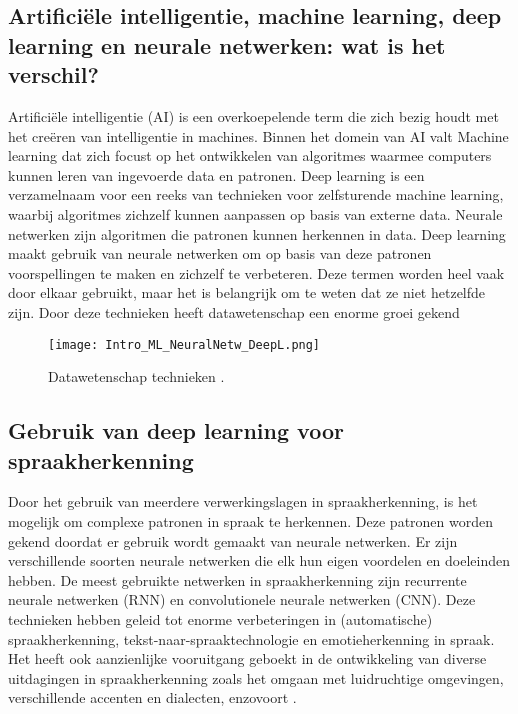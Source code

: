 \subsection{Artificiële intelligentie, machine learning, deep learning en neurale netwerken: wat is het verschil?}
Artificiële intelligentie (AI) is een overkoepelende term die zich bezig houdt met het creëren van intelligentie in machines. Binnen het domein van AI valt Machine learning dat zich focust op het ontwikkelen van algoritmes waarmee computers kunnen leren van ingevoerde data en patronen. Deep learning is een verzamelnaam voor een reeks van technieken voor zelfsturende machine learning, waarbij algoritmes zichzelf kunnen aanpassen op basis van externe data. Neurale netwerken zijn algoritmen die patronen kunnen herkennen in data. Deep learning maakt gebruik van neurale netwerken om op basis van deze patronen voorspellingen te maken en zichzelf te verbeteren. Deze termen worden heel vaak door elkaar gebruikt, maar het is belangrijk om te weten dat ze niet hetzelfde zijn. Door deze technieken heeft datawetenschap een enorme groei gekend \autocite{Choi2020}

\begin{figure}[H]
  \centering
  \texttt{[image: Intro\_ML\_NeuralNetw\_DeepL.png]}
  \caption{Datawetenschap technieken \autocite{Choi2020}.}
\end{figure}

\subsection{Gebruik van deep learning voor spraakherkenning}
Door het gebruik van meerdere verwerkingslagen in spraakherkenning, is het mogelijk om complexe patronen in spraak te herkennen. Deze patronen worden gekend doordat er gebruik wordt gemaakt van neurale netwerken. Er zijn verschillende soorten neurale netwerken die elk hun eigen voordelen en doeleinden hebben. De meest gebruikte netwerken in spraakherkenning zijn recurrente neurale netwerken (RNN) en convolutionele neurale netwerken (CNN). Deze technieken hebben geleid tot enorme verbeteringen in (automatische) spraakherkenning, tekst-naar-spraaktechnologie en emotieherkenning in spraak. Het heeft ook aanzienlijke vooruitgang geboekt in de ontwikkeling van diverse uitdagingen in spraakherkenning zoals het omgaan met luidruchtige omgevingen, verschillende accenten en dialecten, enzovoort \autocite{Mehrish2023}.

